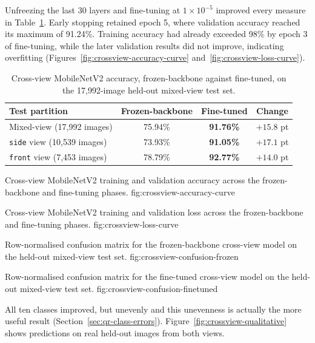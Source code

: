 Unfreezing the last 30 layers and fine-tuning at $1\times10^{-5}$ improved every measure in Table~\ref{tab:crossview}. Early stopping retained epoch 5, where validation accuracy reached its maximum of 91.24\%. Training accuracy had already exceeded 98\% by epoch 3 of fine-tuning, while the later validation results did not improve, indicating overfitting (Figures~\ref{fig:crossview-accuracy-curve} and~\ref{fig:crossview-loss-curve}).

\begin{table}[htbp]
\centering
\caption{Cross-view MobileNetV2 accuracy, frozen-backbone against fine-tuned, on the 17{,}992-image held-out mixed-view test set.}
\label{tab:crossview}
\small
\begin{tabular}{lccc}
\toprule
\textbf{Test partition} & \textbf{Frozen-backbone} & \textbf{Fine-tuned} & \textbf{Change} \\
\midrule
Mixed-view (17{,}992 images) & 75.94\% & \textbf{91.76\%} & $+15.8$ pt \\
\texttt{side} view (10{,}539 images) & 73.93\% & \textbf{91.05\%} & $+17.1$ pt \\
\texttt{front} view (7{,}453 images) & 78.79\% & \textbf{92.77\%} & $+14.0$ pt \\
\bottomrule
\end{tabular}
\end{table}

{Cross-view MobileNetV2 training and validation accuracy across the frozen-backbone and fine-tuning phases.}
{fig:crossview-accuracy-curve}

{Cross-view MobileNetV2 training and validation loss across the frozen-backbone and fine-tuning phases.}
{fig:crossview-loss-curve}

{Row-normalised confusion matrix for the frozen-backbone cross-view model on the held-out mixed-view test set.}
{fig:crossview-confusion-frozen}

{Row-normalised confusion matrix for the fine-tuned cross-view model on the held-out mixed-view test set.}
{fig:crossview-confusion-finetuned}

\FloatBarrier

All ten classes improved, but unevenly and this unevenness is actually the more useful result (Section~\ref{sec:qr-class-errors}). Figure~\ref{fig:crossview-qualitative} shows predictions on real held-out images from both views.

